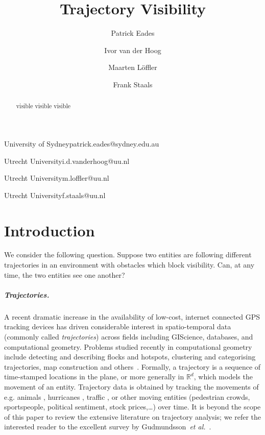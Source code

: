 \documentclass[a4paper, UKenglish]{paper}
\title{Trajectory Visibility}
\newcommand{\etal}{\textit{et al.}\xspace}
\newcommand{\mkmbb}[1]{\ensuremath{\mathbb{#1}}\xspace}
\newcommand{\R}{\mkmbb{R}}
\begin{document}
\author{Patrick Eades}{University of Sydney}{patrick.eades@sydney.edu.au}{}{}
\author{Ivor van der Hoog}{Utrecht University}{i.d.vanderhoog@uu.nl}{}{}
\author{Maarten Löffler}{Utrecht University}{m.loffler@uu.nl}{}{}
\author{Frank Staals}{Utrecht University}{f.staals@uu.nl}{}{}

\maketitle

\begin{abstract}
    visible visible visible
\end{abstract}





\newpage


\section {Introduction}

We consider the following question. Suppose two entities are following different trajectories in an environment with obstacles which block visibility. Can, at any time, the two entities see one another? 

\subparagraph {Trajectories.}

A recent dramatic increase in the availability of low-cost, internet connected GPS tracking devices has driven considerable interest in spatio-temporal data (commonly called {\em trajectories}) across fields including GIScience, databases, and computational geometry. 
Problems studied recently in computational geometry include detecting and describing flocks \cite{AnderssonGLW07, BenkertGHW08, LaubeKI04} and hotspots, clustering and categorising trajectories, map construction and others~\cite{bbgll-dcpcs-11,grsc-pcecu-07,gs-tcmrm-99,lhw-tc-07,vgk-dsmt-02}.
Formally, a trajectory is a 
sequence of time-stamped locations 
in the plane, or more generally in $\R^d$, which
models the movement of an entity.
Trajectory data is obtained by tracking the movements of e.g. animals \cite{BovetB88,Calenge200934,gal-nmibc-09}, hurricanes \cite{Stohl1998947}, traffic \cite{lltx-dftf-10}, or other moving entities \cite{dwf-rpm-09} (pedestrian crowds, sportspeople, political sentiment, stock prices,\ldots) over time.
It is beyond the scope of this paper to review the extensive literature on trajectory analysis; we refer the interested reader to the excellent survey by Gudmundsson~\etal~\cite{GudmundssonLW17}.
\end{document}

